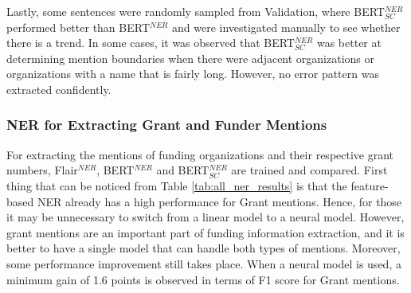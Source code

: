 \documentclass{report}
\theoremstyle{definition}
\theoremstyle{remark}
\begin{document}
Lastly, some sentences were randomly sampled from Validation, where BERT$^{NER}_{SC}$ performed better than BERT$^{NER}$ and were investigated manually to see whether there is a trend. In some cases, it was observed that BERT$^{NER}_{SC}$ was better at determining mention boundaries when there were adjacent organizations or organizations with a name that is fairly long. However, no error pattern was extracted confidently.
\newline
\begin{center}
\end{center}

\subsubsection{NER for Extracting Grant and Funder Mentions}
For extracting the mentions of funding organizations and their respective grant numbers, Flair$^{NER}$, BERT$^{NER}$ and BERT$^{NER}_{SC}$ are trained and compared. First thing that can be noticed from Table \ref{tab:all_ner_results} is that the feature-based NER already has a high performance for Grant mentions. Hence, for those it may be unnecessary to switch from a linear model to a neural model. However, grant mentions are an important part of funding information extraction, and it is better to have a single model that can handle both types of mentions. Moreover, some performance improvement still takes place. When a neural model is used, a minimum gain of 1.6 points is observed in terms of F1 score for Grant mentions.
\end{document}
